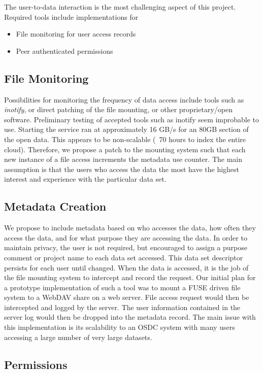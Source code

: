 \begin{multicols*}{2}
The user-to-data interaction is the most challenging aspect of this
project. Required tools include implementations for
\begin{itemize}
\item File monitoring for user access records
\item Peer authenticated permissions
\end{itemize}

\subsection{File Monitoring}

Possibilities for monitoring the frequency of data access include
tools such as \emph{inotify}, or direct patching of the file
mounting, or other proprietary/open software.  Preliminary testing of
accepted tools such as inotify seem improbable to use.  Starting the
service ran at approximately 16 GB/s for an 80GB section of the open
data. This appears to be non-scalable (~70 hours to index the entire
cloud). Therefore, we propose a patch to the mounting system such that
each new instance of a file access increments the metadata use
counter.  The main assumption is that the users who access the data
the most have the highest interest and experience with the particular
data set.

\subsection{Metadata Creation}

We propose to include metadata based on who accesses the data, how
often they access the data, and for what purpose they are accessing
the data.  In order to maintain privacy, the user is not required, but
encouraged to assign a purpose comment or project name to each data set
accessed. This data set descriptor persists for each user until
changed.  When the data is accessed, it is the job of the file
mounting system to intercept and record the request. Our initial plan
for a prototype implementation of such a tool  was to mount a FUSE driven file
system to a WebDAV share on a web server. File access request would
then be intercepted and logged by the server. The user information
contained in the server log would then be dropped into the metadata
record. The main issue with this implementation is its scalability to
an OSDC system with many users accessing a large number of very large
datasets.        

\subsection{Permissions}


\end{multicols*}
